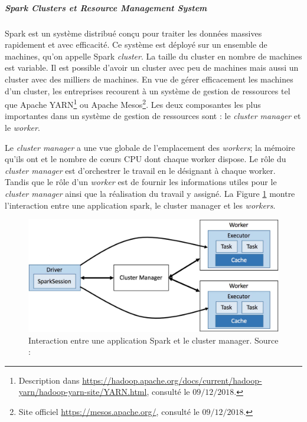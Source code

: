\subparagraph{Spark Clusters et Resource Management System}

Spark est un système distribué conçu pour traiter les données massives rapidement et avec efficacité. Ce système est déployé sur un ensemble de machines, qu'on appelle Spark \textit{cluster}. La taille du cluster en nombre de machines est variable. Il est possible d'avoir un cluster avec peu de machines mais aussi un cluster avec des milliers de machines. En vue de gérer efficacement les machines d'un cluster, les entreprises recourent à un système de gestion de ressources tel que Apache YARN\footnote{Description dans \url{https://hadoop.apache.org/docs/current/hadoop-yarn/hadoop-yarn-site/YARN.html}, consulté le $09/12/2018$.} ou Apache Mesos\footnote{Site officiel \url{https://mesos.apache.org/}, consulté le $09/12/2018$.}. Les deux composantes les plus importantes dans un système de gestion de ressources sont : le \textit{cluster manager} et le \textit{worker}.

Le \textit{cluster manager} a une vue globale de l'emplacement des \textit{workers}; la mémoire qu'ils ont et le nombre de c\oe{}urs CPU dont chaque worker dispose. Le rôle du \textit{cluster manager} est d'orchestrer le travail en le désignant à chaque worker. Tandis que le rôle d'un \textit{worker} est de fournir les informations utiles pour le \textit{cluster manager} ainsi que la réalisation du travail y assigné. La Figure \ref{fig:cluster-overview} montre l'interaction entre une application spark, le cluster manager et les \textit{workers}.


\begin{figure}[H]
	\centering
	\captionsetup{justification= centering}
	\includegraphics[width=0.7\linewidth]{illustrations/cluster-overview.jpg}
	\caption{ Interaction entre une application Spark et le cluster manager. Source : \cite{eginning-Apache-Spark-2-cluster-overwiew}}
	\label{fig:cluster-overview}
\end{figure}




